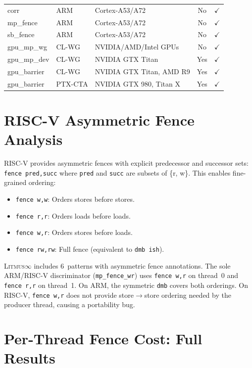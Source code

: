 \documentclass[10pt]{article}
\newcommand{\litmus}{\textsc{Litmus$\infty$}}
\newcommand{\cmark}{$\checkmark$}
\begin{document}
\begin{table}[h]
\begin{tabular}{lllcc}
corr & ARM & Cortex-A53/A72 & No & \cmark \\
mp\_fence & ARM & Cortex-A53/A72 & No & \cmark \\
sb\_fence & ARM & Cortex-A53/A72 & No & \cmark \\
gpu\_mp\_wg & CL-WG & NVIDIA/AMD/Intel GPUs & No & \cmark \\
gpu\_mp\_dev & CL-WG & NVIDIA GTX Titan & Yes & \cmark \\
gpu\_barrier & CL-WG & NVIDIA GTX Titan, AMD R9 & Yes & \cmark \\
gpu\_barrier & PTX-CTA & NVIDIA GTX 980, Titan X & Yes & \cmark \\
\bottomrule
\end{tabular}
\end{table}

\section{RISC-V Asymmetric Fence Analysis}
\label{app:riscv-fences}

RISC-V provides asymmetric fences with explicit predecessor and
successor sets: \texttt{fence~pred,succ} where \texttt{pred} and
\texttt{succ} are subsets of \{r, w\}. This enables fine-grained
ordering:

\begin{itemize}[nosep]
\item \texttt{fence~w,w}: Orders stores before stores.
\item \texttt{fence~r,r}: Orders loads before loads.
\item \texttt{fence~w,r}: Orders stores before loads.
\item \texttt{fence~rw,rw}: Full fence (equivalent to \texttt{dmb~ish}).
\end{itemize}

\litmus{} includes 6~patterns with asymmetric fence annotations.
The sole ARM/RISC-V discriminator (\texttt{mp\_fence\_wr}) uses
\texttt{fence~w,r} on thread~0 and \texttt{fence~r,r} on thread~1.
On ARM, the symmetric \texttt{dmb} covers both orderings. On RISC-V,
\texttt{fence~w,r} does not provide store$\to$store ordering needed
by the producer thread, causing a portability bug.

\section{Per-Thread Fence Cost: Full Results}
\label{app:fence-cost-full}
\end{document}
